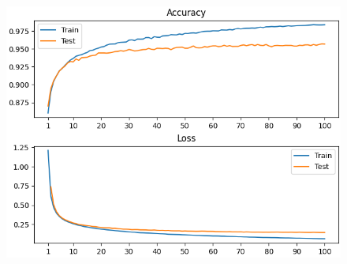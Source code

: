 \documentclass[10pt,a4paper,fullpage]{article}
\begin{document}
\begin{figure}
	\begin{center}
%		
		\includegraphics[scale=1]{mlp_model.png}
	\end{center}
\end{figure}
\end{document}
